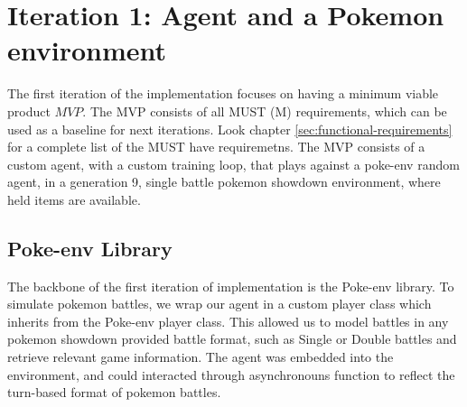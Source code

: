 \section{Iteration 1: Agent and a Pokemon environment} 
\label{sec:Iteration-1-Agent-Environment}

The first iteration of the implementation focuses on having a minimum viable product \(MVP\). The MVP
consists of all MUST (M) requirements, which can be used as a baseline for next iterations.
Look chapter \ref{sec:functional-requirements} for a complete list of the MUST have requiremetns.
The MVP consists of a custom agent, with a custom training loop, that plays against a poke-env random agent,
in a generation 9, single battle pokemon showdown environment, where held items are available. 

\subsection{Poke-env Library}
The backbone of the first iteration of implementation is the Poke-env library. 
To simulate pokemon battles, we wrap our agent in a custom player class which inherits from the
Poke-env player class. This allowed us to model battles in any pokemon showdown 
provided battle format, such as Single or Double battles and retrieve relevant game information.
The agent was embedded into the environment, and could interacted through asynchronouns function
to reflect the turn-based format of pokemon battles.


